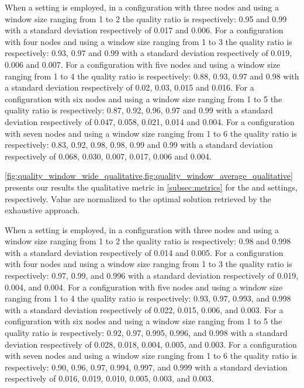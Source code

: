 When a \average setting is employed, in a configuration with three nodes and using a window size ranging from 1 to 2 the quality ratio is respectively: 0.95 and 0.99 with a standard deviation respectively of 0.017 and 0.006. For a configuration with four nodes and using a window size ranging from 1 to 3 the quality ratio is respectively: 0.93, 0.97 and 0.99 with a standard deviation respectively of 0.019, 0.006 and 0.007. For a configuration with five nodes and using a window size ranging from 1 to 4 the quality ratio is respectively:
0.88, 0.93, 0.97 and 0.98 with a standard deviation respectively of 0.02, 0.03, 0.015 and 0.016. For a configuration with six nodes and using a window size ranging from 1 to 5 the quality ratio is respectively:
0.87, 0.92, 0.96, 0.97 and 0.99 with a standard deviation respectively of 0.047, 0.058, 0.021, 0.014 and 0.004. For a configuration with seven nodes and using a window size ranging from 1 to 6 the quality ratio is respectively:
0.83, 0.92, 0.98, 0.98, 0.99 and 0.99 with a standard deviation respectively of 0.068, 0.030, 0.007, 0.017, 0.006 and 0.004.


\cref{fig:quality_window_wide_qualitative,fig:quality_window_average_qualitative} presents our results the qualitative metric in \cref{subsec:metrics} for the \wide and \average settings, respectively.
Value are normalized to the optimal solution retrieved by the exhaustive approach.

When a \wide setting is employed, in a configuration with three nodes and using a window size ranging from 1 to 2 the quality ratio is respectively: 0.98 and 0.998 with a standard deviation respectively of 0.014 and 0.005. For a configuration with four nodes and using a window size ranging from 1 to 3 the quality ratio is respectively: 0.97, 0.99, and 0.996 with a standard deviation respectively of 0.019, 0.004, and 0.004. For a configuration with five nodes and using a window size ranging from 1 to 4 the quality ratio is respectively:
0.93, 0.97, 0.993, and 0.998 with a standard deviation respectively of 0.022, 0.015, 0.006, and 0.003. For a configuration with six nodes and using a window size ranging from 1 to 5 the quality ratio is respectively:
0.92, 0.97, 0.995, 0.996, and 0.998 with a standard deviation respectively of 0.028, 0.018, 0.004, 0.005, and 0.003. For a configuration with seven nodes and using a window size ranging from 1 to 6 the quality ratio is respectively:
0.90, 0.96, 0.97, 0.994, 0.997, and 0.999 with a standard deviation respectively of 0.016, 0.019, 0.010, 0.005, 0.003, and 0.003.



